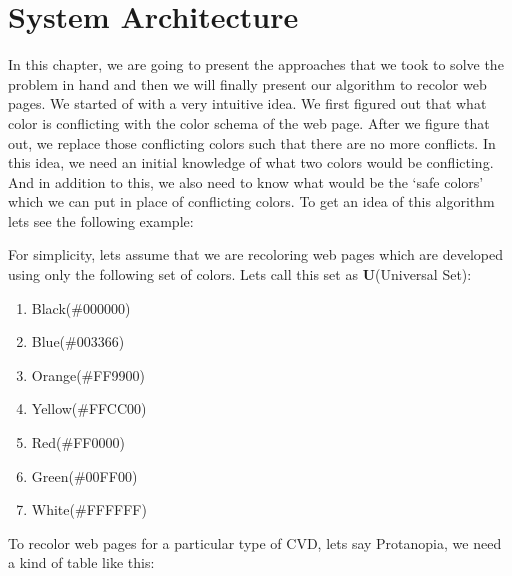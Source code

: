 \chapter{System Architecture}
\thispagestyle{plain}


\label{System Architecture}
In this chapter, we are going to present the approaches that we took to solve the problem in hand and then we will finally present our algorithm to recolor web pages.
We started of with a very intuitive idea. We first figured out that what color is conflicting with the color schema of the web page. After we figure that out, we replace those conflicting colors such that there are no more conflicts. In this idea, we need an initial knowledge of what two colors would be conflicting. And in addition to this, we also need to know what would be the ‘safe colors’ which we can put in place of conflicting colors. To get an idea of this algorithm lets see the following example:

For simplicity, lets assume that we are recoloring web pages which are developed using only the following set of colors. Lets call this set as \textbf{U}(Universal Set):
\begin{enumerate}
    \item Black(\#000000)
    \item Blue(\#003366)
    \item Orange(\#FF9900)
    \item Yellow(\#FFCC00)
    \item Red(\#FF0000)
    \item Green(\#00FF00)
    \item White(\#FFFFFF)
\end{enumerate}

To recolor web pages for a particular type of CVD, lets say Protanopia, we need a kind of table like this:

{\vspace{10mm}}
\label{Tick}

